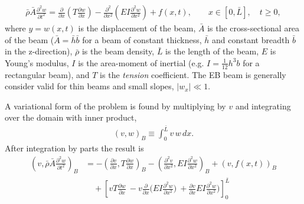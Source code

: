 \documentclass[11pt]{article}
\begin{document}
\newcommand{\rhos}{\bar{\rho}}
\newcommand{\hs}{\bar{h}}
\newcommand{\bs}{\bar{b}}
\newcommand{\As}{\bar{A}}
\newcommand{\Ts}{\bar{T}}
\newcommand{\Ls}{\bar{L}}
\begin{align}
  \rhos \As \frac{\partial^2 w}{\partial t^2} = 
                   \frac{\partial}{\partial x}\left( T \frac{\partial w}{\partial x}\right)
                   - \frac{\partial^2}{\partial x^2}\left( E I \frac{\partial^2 w}{\partial x^2}\right)
                   + f(x,t), \qquad x\in[0,\Ls], \quad t\ge 0,
\end{align}
where $y=w(x,t)$ is the displacement of the beam, 
$\As$ is the cross-sectional area of the beam ($\As=\hs\bs$ for a beam of constant thickness, $\hs$ and constant breadth $\bs$ in the z-direction), 
$\rhos$ is the beam density, $\Ls$ is the length of the beam, 
$E$ is Young's modulus, $I$ is the area-moment of inertial (e.g. $I=\frac{1}{12} h^3 b$ for a rectangular beam),
and $T$ is the {\em tension} coefficient. 
% 
The EB beam is generally consider valid for thin beams and small slopes,  $|w_x| \ll 1$.


A variational form of the problem is found by multiplying by $v$ and integrating over the domain with inner product,
\begin{align}
   (v,w)_B \equiv \int_0^{\Ls} v \, w \, dx. 
\end{align}
After integration by parts the result is 
\begin{align}
 \left( v,  \rhos \As \frac{\partial^2 w}{\partial t^2} \right)_B  &= 
                  - \left( \frac{\partial v}{\partial x} , T \frac{\partial w}{\partial x} \right)_B
                  -\left(\frac{\partial^2 v}{\partial x^2}, E I \frac{\partial^2 w}{\partial x^2}\right)_B  + ( v, f(x,t))_B \\
             &\quad  +   \left[ v T \frac{\partial w}{\partial x} ~ -v \frac{\partial}{\partial x}\Big( E I \frac{\partial^2 w}{\partial x^2}\Big) 
                      ~ + \frac{\partial v}{\partial x}E I \frac{\partial^2 w}{\partial x^2}\Big)  
                      \right]_0^{\Ls}   \label{eq:beamBoundaryTerms}
\end{align}
\end{document}
